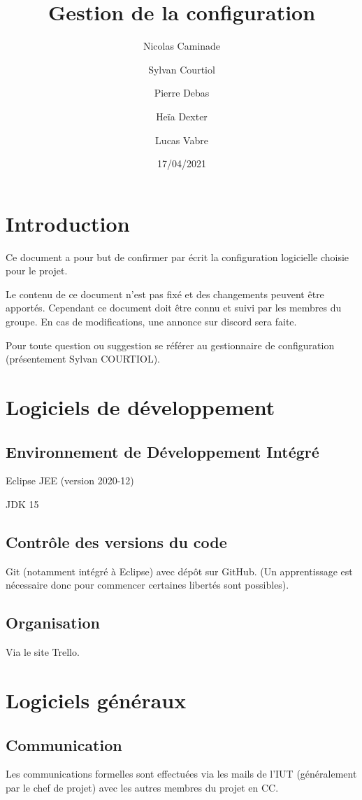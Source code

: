 \documentclass[a4paper]{article}%
\title{Gestion de la configuration}
\author{Nicolas Caminade \and Sylvan Courtiol \and Pierre Debas \and Heïa Dexter \and Lucas Vabre}
\date{17/04/2021}
\begin{document}
	\setlength{\parskip}{8pt}  %
	\maketitle
	\section*{Introduction}
	Ce document a pour but de confirmer par écrit la configuration logicielle choisie pour le projet.
	
	
	Le contenu de ce document n’est pas fixé et des changements peuvent être apportés. Cependant ce document doit être connu et suivi par les membres du groupe. En cas de modifications, une annonce sur discord sera faite.
	
	
	Pour toute question ou suggestion se référer au gestionnaire de configuration (présentement Sylvan COURTIOL).
	
	
    \section{Logiciels de développement}
        \subsection{Environnement de Développement Intégré}
        Eclipse JEE (version 2020-12)
        \par JDK 15
        
        \subsection{Contrôle des versions du code}
        Git (notamment intégré à Eclipse) avec dépôt sur GitHub. (Un apprentissage est nécessaire donc pour commencer certaines libertés sont possibles).
        
        \subsection{Organisation}
        Via le site Trello.
        
    \section{Logiciels généraux}
        \subsection{Communication}
        Les communications formelles sont effectuées via les mails de l’IUT (généralement par le chef de projet) avec les autres membres du projet en CC.
        
\end{document}
